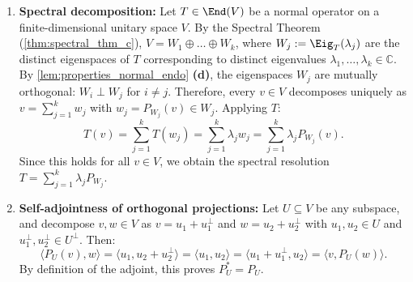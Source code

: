 \begin{exercisesolution}
\label{sol:spectral_decomposition_projections}
\begin{enumerate}[label=\textbf{(\alph*)}]
    \item \textbf{Spectral decomposition:}
    Let $T \in \End(V)$ be a normal operator on a finite-di\-men\-sional unitary space $V$.
    By the Spectral Theorem (\cref{thm:spectral_thm_c}), $V = W_1 \oplus \dots \oplus W_k$, where $W_j := \Eig_T(\lambda_j)$ are the distinct eigenspaces of $T$ corresponding to distinct eigenvalues $\lambda_1, \dots, \lambda_k \in \mathbb{C}$.
    By \cref{lem:properties_normal_endo} \textbf{(d)}, the eigenspaces $W_j$ are mutually orthogonal: $W_i \perp W_j$ for $i \ne j$.
    Therefore, every $v \in V$ decomposes uniquely as $v = \sum_{j=1}^k w_j$ with $w_j = P_{W_j}(v) \in W_j$.
    Applying $T$:
    \[
    T(v) = \sum_{j=1}^k T(w_j) = \sum_{j=1}^k \lambda_j w_j = \sum_{j=1}^k \lambda_j P_{W_j}(v).
    \]
    Since this holds for all $v \in V$, we obtain the spectral resolution $T = \sum_{j=1}^k \lambda_j P_{W_j}$.

    \item \textbf{Self-adjointness of orthogonal projections:}
    Let $U \subseteq V$ be any subspace, and decompose $v, w \in V$ as $v = u_1 + u_1^\perp$ and $w = u_2 + u_2^\perp$ with $u_1, u_2 \in U$ and $u_1^\perp, u_2^\perp \in U^\perp$.
    Then:
    \[
    \langle P_U(v), w \rangle = \langle u_1, u_2 + u_2^\perp \rangle = \langle u_1, u_2 \rangle = \langle u_1 + u_1^\perp, u_2 \rangle = \langle v, P_U(w) \rangle.
    \]
    By definition of the adjoint, this proves $P_U^* = P_U$. \qedhere
\end{enumerate}
\end{exercisesolution}

